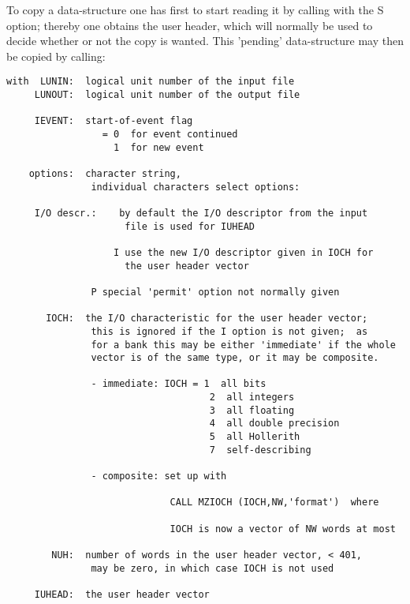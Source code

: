 To copy a data-structure one has first to start reading it by calling
 with the S option; thereby one obtains the user header,
which will normally be used to decide whether or not the copy is
wanted. This 'pending' data-structure may then be copied by
calling:

\begin{verbatim}
with  LUNIN:  logical unit number of the input file
     LUNOUT:  logical unit number of the output file

     IEVENT:  start-of-event flag
                 = 0  for event continued
                   1  for new event

    options:  character string,
               individual characters select options:

     I/O descr.:    by default the I/O descriptor from the input
                     file is used for IUHEAD

                   I use the new I/O descriptor given in IOCH for
                     the user header vector

               P special 'permit' option not normally given

       IOCH:  the I/O characteristic for the user header vector;
               this is ignored if the I option is not given;  as
               for a bank this may be either 'immediate' if the whole
               vector is of the same type, or it may be composite.

               - immediate: IOCH = 1  all bits
                                    2  all integers
                                    3  all floating
                                    4  all double precision
                                    5  all Hollerith
                                    7  self-describing

               - composite: set up with

                             CALL MZIOCH (IOCH,NW,'format')  where

                             IOCH is now a vector of NW words at most

        NUH:  number of words in the user header vector, < 401,
               may be zero, in which case IOCH is not used

     IUHEAD:  the user header vector
\end{verbatim}

